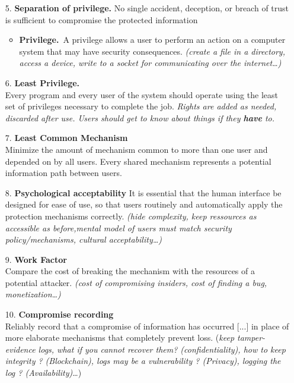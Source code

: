 \documentclass[8pt]{article}
\begin{document}
\noindent \begin{minipage}[htp]{0.49\textwidth}
	\begin{itemize}
		\item[5.] \textbf{Separation of privilege.}	No single accident, deception, or breach of trust is sufficient to compromise the protected information
		      \begin{itemize}
			      \item \textbf{Privilege.}\
			            A privilege allows a user to perform an action on a computer system that may have security consequences. \textit{(create a file in a directory, access a device, write to a socket for communicating over the internet\dots)}
		      \end{itemize}

		\item[6.] \textbf{Least Privilege.}\\
		      Every program and every user of the system should operate using the least set of privileges necessary to complete the job. \textit{Rights are added as needed, discarded after use. Users should get to know about things if they \textbf{have} to.}

		\item[7.] \textbf{Least Common Mechanism}\\
		      Minimize the amount of mechanism common to more than one user and depended on by all users. Every shared mechanism represents a potential information path between users.
		\item[8.] \textbf{Psychological acceptability}
		      It is essential that the human interface be designed for ease of use, so that users routinely and automatically apply the protection mechanisms correctly. \textit{(hide complexity, keep ressources as accessible as before,mental model of users must match security policy/mechanisms, cultural acceptability\dots)}
		\item[9.] \textbf{Work Factor}\\
		      Compare the cost of breaking the mechanism with the resources of a potential attacker. \textit{(cost of compromising insiders, cost of finding a bug, monetization\dots)}
		\item[10.] \textbf{Compromise recording}\\
		      Reliably record that a compromise of information has occurred [...] in place of more elaborate mechanisms that completely prevent loss.
		      (\textit{keep tamper-evidence logs, what if you cannot recover them? (confidentiality), how to keep integrity ? (Blockchain), logs may be a vulnerability ? (Privacy), logging the log ? (Availability)}\ldots)
	\end{itemize}
\end{minipage}
\end{document}
